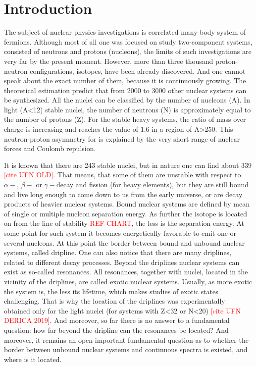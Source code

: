 \section{Introduction}

The subject of nuclear physics investigations is correlated many-body system of fermions. 
Although most of all one was focused on study two-component systems, consisted of neutrons and protons (nucleons), the limits of such investigations are very far by the present moment.
However, more than three thousand proton-neutron configurations, isotopes, have been already	 discovered.
And one cannot speak about the exact number of them, because it is continuously growing. 
The theoretical estimation predict that from 2000 to 3000 other nuclear systems can be synthesized.  
All the nuclei can be classified by the number of nucleons (A). 
In light (A<12) stable nuclei, the number of neutrons (N) is approximately equal to the number of protons (Z). 
For the stable heavy systems, the ratio of mass over charge is increasing and reaches the value of 1.6 in a region of A>250. 
This neutron-proton asymmetry for is explained by the very short range of nuclear forces and Coulomb repulsion.

It is known that there are 243 stable nuclei, but in nature one can find about 339 \textcolor{red}{[cite UFN OLD]}. 
That means, that some of them are unstable with respect to $\alpha-$, $\beta-$ or $\gamma-$decay and fission (for heavy elements), but they are still bound and live long enough to come down to us from the early universe, or are decay products of heavier nuclear systems. 
Bound nuclear systems are defined by mean of single or multiple nucleon separation energy.
As further the isotope is located on from the line of stability \textcolor{red}{REF CHART}, the less is the separation energy.
At some point for such system it becomes energetically favorable to emit one or several nucleons.
At this point the border between bound and unbound nuclear systems, called dripline.
One can also notice that there are many driplines, related to different decay processes.
Beyond the driplines nuclear systems can exist as so-called resonances.
All resonances, together with nuclei, located in the vicinity of the driplines, are called exotic nuclear systems.
Usually, as more exotic the system is, the less its lifetime, which makes studies of exotic states challenging. 
That is why the location of the driplines was experimentally obtained only for the light nuclei (for systems with Z<32 or N<20) \textcolor{red}{[cite UFN DERICA 2019]}.
And moreover, so far there is no answer to a fundamental question: how far beyond the dripline can the resonances be located? 
And moreover, it remains an open important fundamental question as to whether the border between unbound nuclear systems and continuous spectra is existed, and where is it located.


